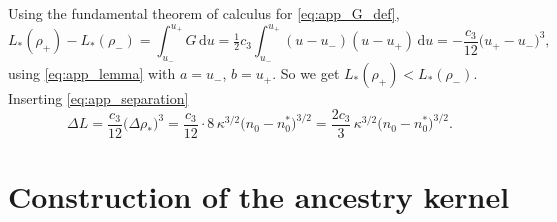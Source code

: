 \documentclass[11pt,a4paper]{report}
\newcommand{\dd}{\,\mathrm d}
\begin{document}
Using the fundamental theorem of calculus for \eqref{eq:app_G_def},
\begin{equation}
	L_*(\rho_+)-L_*(\rho_-)=\int_{u_-}^{u_+}G\dd u
	=\tfrac12c_3\int_{u_-}^{u_+}(u-u_-)(u-u_+)\dd u
	=-\frac{c_3}{12}\bigl(u_+-u_-\bigr)^3,
	\label{eq:app_signed_width}
\end{equation}
using \eqref{eq:app_lemma} with $a=u_-$, $b=u_+$. So we get
$L_*(\rho_+)<L_*(\rho_-)$. Inserting
\eqref{eq:app_separation}
\begin{equation}
	\Delta L=\frac{c_3}{12}\bigl(\Delta\rho_*\bigr)^3
	=\frac{c_3}{12}\cdot8\,\kappa^{3/2}\bigl(n_0-n_0^{*}\bigr)^{3/2}
	=\frac{2c_3}{3}\,\kappa^{3/2}\bigl(n_0-n_0^{*}\bigr)^{3/2}.
	\label{eq:app_window}
\end{equation}
	\section{Construction of the ancestry kernel}
	\label{ancestrytheory}
\end{document}

